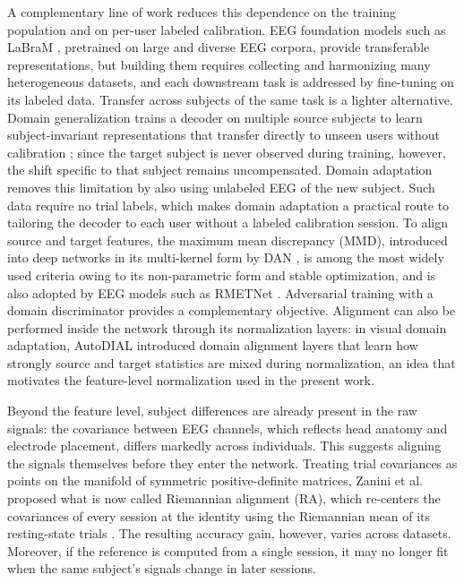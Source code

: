 \documentclass[preprint,12pt]{elsarticle}
\begin{document}
A complementary line of work reduces this dependence on the training population and on per-user labeled calibration. EEG foundation models such as LaBraM \cite{jiang2024labram}, pretrained on large and diverse EEG corpora, provide transferable representations, but building them requires collecting and harmonizing many heterogeneous datasets, and each downstream task is addressed by fine-tuning on its labeled data. Transfer across subjects of the same task is a lighter alternative. Domain generalization trains a decoder on multiple source subjects to learn subject-invariant representations that transfer directly to unseen users without calibration \cite{zhong2025eegdg}; since the target subject is never observed during training, however, the shift specific to that subject remains uncompensated. Domain adaptation removes this limitation by also using unlabeled EEG of the new subject. Such data require no trial labels, which makes domain adaptation a practical route to tailoring the decoder to each user without a labeled calibration session. To align source and target features, the maximum mean discrepancy (MMD), introduced into deep networks in its multi-kernel form by DAN \cite{long2015dan}, is among the most widely used criteria owing to its non-parametric form and stable optimization, and is also adopted by EEG models such as RMETNet \cite{zhao2026rmetnet}. Adversarial training with a domain discriminator \cite{ganin2016dann,tang2020cdan} provides a complementary objective. Alignment can also be performed inside the network through its normalization layers: in visual domain adaptation, AutoDIAL \cite{carlucci2017autodial} introduced domain alignment layers that learn how strongly source and target statistics are mixed during normalization, an idea that motivates the feature-level normalization used in the present work.

Beyond the feature level, subject differences are already present in the raw signals: the covariance between EEG channels, which reflects head anatomy and electrode placement, differs markedly across individuals. This suggests aligning the signals themselves before they enter the network. Treating trial covariances as points on the manifold of symmetric positive-definite matrices, Zanini et al. proposed what is now called Riemannian alignment (RA), which re-centers the covariances of every session at the identity using the Riemannian mean of its resting-state trials \cite{zanini2018riemannian}. The resulting accuracy gain, however, varies across datasets. Moreover, if the reference is computed from a single session, it may no longer fit when the same subject's signals change in later sessions.
\end{document}
